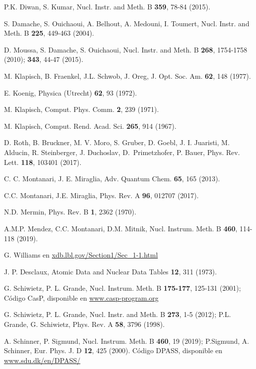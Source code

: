 \begin{thebibliography}{9}
P.K. Diwan, S. Kumar, 
Nucl. Instr. and Meth. B \textbf{359}, 78-84 (2015).

S. Damache, S. Ouichaoui, A. Belhout, A. Medouni, I. Toumert, 
Nucl. Instr. and Meth. B \textbf{225}, 449-463 (2004).

D. Moussa, S. Damache, S. Ouichaoui, 
Nucl. Instr. and Meth. B \textbf{268}, 1754-1758 (2010); 
\textbf{343},  44-47 (2015).

M. Klapisch, B. Fraenkel, J.L. Schwob, J. Oreg,
J. Opt. Soc. Am. \textbf{62}, 148 (1977).

E. Koenig,
Physica (Utrecht) \textbf{62}, 93 (1972).

M. Klapisch,
Comput. Phys. Comm. \textbf{2}, 239 (1971).

M. Klapisch,
Comput. Rend. Acad. Sci. \textbf{265}, 914 (1967).

D. Roth, B. Bruckner, M. V. Moro, S. Gruber, D. Goebl, J. I. Juaristi,
M. Alducin, R. Steinberger, J. Duchoslav, \mbox{D. Primetzhofer}, P. Bauer,
Phys. Rev. Lett. \textbf{118}, 103401 (2017).

C. C. Montanari, J. E. Miraglia,
Adv. Quantum Chem. \textbf{65}, 165 (2013).

C.C. Montanari, J.E. Miraglia, 
Phys. Rev. A \textbf{96}, 012707 (2017).

N.D. Mermin, 
Phys. Rev. B \textbf{1}, 2362 (1970).

A.M.P. Mendez, C.C. Montanari, D.M. Mitnik, 
Nucl. Instrum. Meth. B \textbf{460}, 114-118 (2019).

G. Williams en 
\href{http://xdb.lbl.gov/Section1/Sec\_1-1.html}{xdb.lbl.gov/Section1/Sec\_1-1.html}

J. P. Desclaux,
Atomic Data and Nuclear Data Tables \textbf{12}, 311 (1973).

G. Schiwietz, P. L. Grande, 
Nucl. Instrum. Meth. B \textbf{175-177}, 125-131 (2001); 
Código CasP, disponible en \href{https://www.casp-program.org}{www.casp-program.org}

G. Schiwietz, P. L. Grande,
Nucl. Instr. and Meth. B \textbf{273}, 1-5 (2012); 
P.L. Grande, G. Schiwietz, 
Phys. Rev. A \textbf{58}, 3796 (1998).

A. Schinner, P. Sigmund, 
Nucl. Instrum. Meth. B \textbf{460}, 19 (2019); 
P.Sigmund, A. Schinner, 
Eur. Phys. J. D \textbf{12}, 425 (2000). 
Código DPASS, disponible en \href{https://www.sdu.dk/en/DPASS/}{www.sdu.dk/en/DPASS/}


\end{thebibliography}

